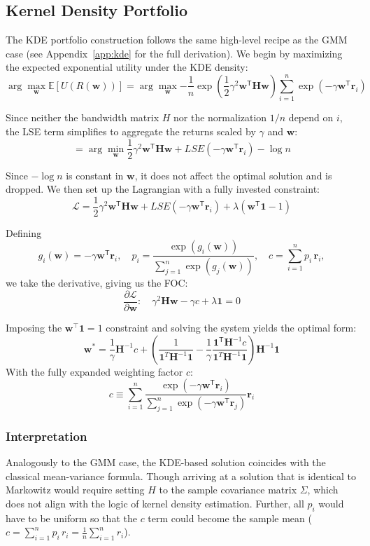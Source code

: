 \subsection{Kernel Density Portfolio}
The KDE portfolio construction follows the same high-level recipe as the GMM case (see Appendix~\ref{app:kde} for the full derivation). We begin by maximizing the expected exponential utility under the KDE density:
$$\arg\max_\mathbf{w}{\mathbb{E}[U(R(\mathbf{w}))]}=\arg\max_\mathbf{w}{-\frac{1}{n}\exp\left(\frac{1}{2}\gamma^2\mathbf{w}^{\mathsf{T}}\mathbf{H}\mathbf{w}\right)\sum_{i=1}^{n}\exp\left(-\gamma\mathbf{w}^{\mathsf{T}}\mathbf{r}_i\right)}$$

Since neither the bandwidth matrix $H$ nor the normalization $1/n$ depend on $i$, the LSE term simplifies to aggregate the returns scaled by $\gamma$ and $\mathbf{w}$:
$$=\arg\min_\mathbf{w}\frac{1}{2}\gamma^2\mathbf{w}^{\mathsf{T}}\mathbf{H}\mathbf{w}+LSE(-\gamma\mathbf{w}^{\mathsf{T}}\mathbf{r}_i)-\log{n}$$

Since $-\log{n}$ is constant in $\mathbf{w}$, it does not affect the optimal solution and is dropped. We then set up the Lagrangian with a fully invested constraint:
$$\mathcal{L}=\frac{1}{2}\gamma^2\mathbf{w}^{\mathsf{T}}\mathbf{H}\mathbf{w}+LSE(-\gamma\mathbf{w}^{\mathsf{T}}\mathbf{r}_i)+\lambda(\mathbf{w^{\mathsf{T}}1}-1)$$

Defining
$$g_i(\mathbf w)=-\gamma\mathbf{w}^{\mathsf{T}}\mathbf{r}_{i},
\quad p_i=\frac{\exp\left(g_i(\mathbf w)\right)}{\sum_{j=1}^n\exp\left(g_j(\mathbf w)\right)},\quad
c=\sum_{i=1}^n p_i\,\mathbf{r}_i,$$
we take the derivative, giving us the FOC:
$$\frac{\partial\mathcal{L}}{\partial\mathbf{w}}:\quad\gamma^{2}\mathbf{H}\mathbf{w}-\gamma c+\lambda\mathbf{1}=0$$

Imposing the $\mathbf w^\top\mathbf1=1$ constraint and solving the system yields the optimal form:
$$\boxed{\mathbf{w}^*=\frac{1}{\gamma}\mathbf{H}^{-1}c+\left(\frac{1}{\mathbf1^T \mathbf{H}^{-1}\mathbf1}-\frac{1}{\gamma}\frac{\mathbf{1}^{\mathsf{T}}\mathbf{H}^{-1}c}{\mathbf1^T \mathbf{H}^{-1}\mathbf1}\right)\mathbf{H}^{-1}\mathbf{1}}$$
With the fully expanded weighting factor $c$:
$$c\equiv \sum_{i=1}^{n} \frac{\exp (-\gamma\mathbf{w}^{\mathsf{T}}\mathbf{r}_{i})}{\sum_{j=1}^{n} \exp (-\gamma\mathbf{w}^{\mathsf{T}}\mathbf{r}_{j})} \mathbf{r}_i$$

\subsubsection{Interpretation}
Analogously to the GMM case, the KDE-based solution coincides with the classical mean-variance formula. Though arriving at a solution that is identical to Markowitz would require setting $H$ to the sample covariance matrix $\Sigma$, which does not align with the logic of kernel density estimation. Further, all $p_i$ would have to be uniform so that the $c$ term could become the sample mean ($c=\sum_{i=1}^n p_i\,r_i =\frac1n\sum_{i=1}^n r_i$).

